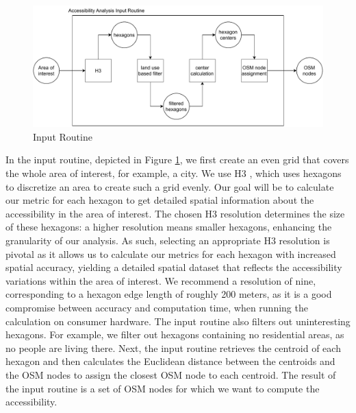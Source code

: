 \begin{figure}
    \centering
    \includegraphics[scale=0.50]{Figures/method/input_routine}
    \caption{Input Routine}
    \label{fig:input_routine}
\end{figure}
In the input routine, depicted in Figure \ref{fig:input_routine}, we first create an even grid that covers the whole area of interest, for example, a city.
We use H3 , which uses hexagons to discretize an area to create such a grid evenly.
Our goal will be to calculate our metric for each hexagon to get detailed spatial information about the accessibility in the area of interest.
The chosen H3 resolution determines the size of these hexagons: a higher resolution means smaller hexagons, enhancing the granularity of our analysis. 
As such, selecting an appropriate H3 resolution is pivotal as it allows us to calculate our metrics for each hexagon with increased spatial accuracy, yielding a detailed spatial dataset that reflects the accessibility variations within the area of interest.
We recommend a resolution of nine, corresponding to a hexagon edge length of roughly 200 meters, as it is a good compromise between accuracy and computation time, when running the calculation on consumer hardware. 
The input routine also filters out uninteresting hexagons.
For example, we filter out hexagons containing no residential areas, as no people are living there.
Next, the input routine retrieves the centroid of each hexagon and then calculates the Euclidean distance between the centroids and the OSM nodes to assign the closest OSM node to each centroid.
The result of the input routine is a set of OSM nodes for which we want to compute the accessibility.


